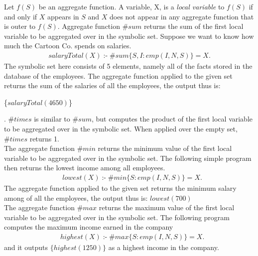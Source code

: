 \documentclass[14pt,a4paper, titlepage]{article}
\DeclareMathOperator{\leftimpl}{:-}
\begin{document}
\bigskip Let $f(S)$ be an aggregate function. A variable, X, is a \emph{local variable} to $f(S)$ if and only if $X$ appears in $S$ and $X$ does not appear in any aggregate function that is outer to $f(S)$. Aggregate function $\mathit{\#sum}$ returns the sum of the first local variable to be aggregated over in the symbolic set. Suppose we want to know how much the Cartoon Co. spends on salaries.
\begin{align*}
\mathit{salaryTotal(X)} \leftimpl \mathit{\#sum}\{S,I : \mathit{emp(I,N,S)}\} = X.
\end{align*}
The symbolic set here consists of 5 elements, namely all of the facts stored in the database of the employees. The aggregate function applied to the given set returns the sum of the salaries of all the employees, the output thus is: \\ \centerline{
\{$\mathit{salaryTotal(4650)}$\}}. $\mathit{\#times}$ is similar to $\mathit{\#sum}$, but computes the product of the first local variable to be aggregated over in the symbolic set. When applied over the empty set, $\mathit{\#times}$ returns 1.
\bigskip \\The aggregate function $\mathit{\#min}$ returns the minimum value of the first local variable to be aggregated over in the symbolic set. The following simple program then returns the lowest income among all employees.
\begin{align*}
& lowest(X) \leftimpl \#min\{S : emp(I,N,S)\} = X.
\end{align*}
The aggregate function applied to the given set returns the minimum salary among of all the employees, the output thus is:
{$\mathit{lowest(700)}$}
\bigskip \\The aggregate function $\mathit{\#max}$ returns the maximum value of the first local variable to be aggregated over in the symbolic set. The following program computes the maximum income earned in the company
\begin{align*}
& \mathit{highest}(X) \leftimpl \mathit{\#max}\{S : \mathit{emp}(I,N,S)\} = X.
\end{align*}
and it outputs $\{highest(1250)\}$ as a highest income in the company.
\end{document}

